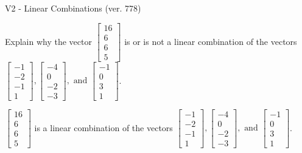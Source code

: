 \begin{exercise}
  \begin{exerciseTitle}V2 - Linear Combinations (ver. 778)\end{exerciseTitle}
  \begin{exerciseStatement}
    Explain why the vector \(\left[\begin{array}{c}
16 \\
6 \\
6 \\
5
\end{array}\right]\)  is or is not a linear 
	combination of the vectors \(\left[\begin{array}{c}
-1 \\
-2 \\
-1 \\
1
\end{array}\right] , \left[\begin{array}{c}
-4 \\
0 \\
-2 \\
-3
\end{array}\right] , \text{ and } \left[\begin{array}{c}
-1 \\
0 \\
3 \\
1
\end{array}\right]\).
	


  \end{exerciseStatement}
  \begin{exerciseAnswer}
   \(\left[\begin{array}{c}
16 \\
6 \\
6 \\
5
\end{array}\right]\) 
  	 is  
	a linear combination of the vectors \(\left[\begin{array}{c}
-1 \\
-2 \\
-1 \\
1
\end{array}\right] , \left[\begin{array}{c}
-4 \\
0 \\
-2 \\
-3
\end{array}\right] , \text{ and } \left[\begin{array}{c}
-1 \\
0 \\
3 \\
1
\end{array}\right]\).

	
  


  \end{exerciseAnswer}
\end{exercise}